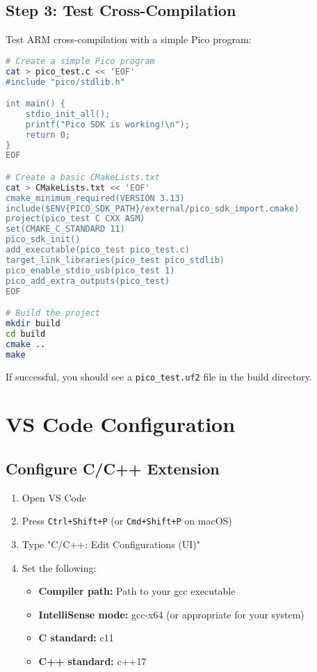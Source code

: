 \documentclass[11pt,a4paper]{article}
\begin{document}
\subsection{Step 3: Test Cross-Compilation}
Test ARM cross-compilation with a simple Pico program:

\begin{lstlisting}[language=bash]
# Create a simple Pico program
cat > pico_test.c << 'EOF'
#include "pico/stdlib.h"

int main() {
    stdio_init_all();
    printf("Pico SDK is working!\n");
    return 0;
}
EOF

# Create a basic CMakeLists.txt
cat > CMakeLists.txt << 'EOF'
cmake_minimum_required(VERSION 3.13)
include($ENV{PICO_SDK_PATH}/external/pico_sdk_import.cmake)
project(pico_test C CXX ASM)
set(CMAKE_C_STANDARD 11)
pico_sdk_init()
add_executable(pico_test pico_test.c)
target_link_libraries(pico_test pico_stdlib)
pico_enable_stdio_usb(pico_test 1)
pico_add_extra_outputs(pico_test)
EOF

# Build the project
mkdir build
cd build
cmake ..
make
\end{lstlisting}

If successful, you should see a \texttt{pico\_test.uf2} file in the build directory.

\section{VS Code Configuration}

\subsection{Configure C/C++ Extension}
\begin{enumerate}
    \item Open VS Code
    \item Press \texttt{Ctrl+Shift+P} (or \texttt{Cmd+Shift+P} on macOS)
    \item Type "C/C++: Edit Configurations (UI)"
    \item Set the following:
    \begin{itemize}
        \item \textbf{Compiler path:} Path to your gcc executable
        \item \textbf{IntelliSense mode:} gcc-x64 (or appropriate for your system)
        \item \textbf{C standard:} c11
        \item \textbf{C++ standard:} c++17
    \end{itemize}
\end{enumerate}
\end{document}
